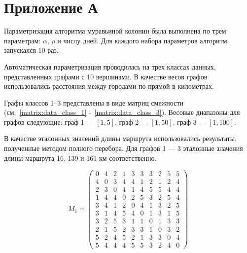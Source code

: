 \documentclass{bmstu}
\begin{document}
\setcounter{page}{3}

\chapter*{Приложение А}

Параметризация алгоритма муравьиной колонии была выполнена по трем параметрам: $\alpha$, $\rho$ и числу дней. Для каждого набора параметров алгоритм запускался 10 раз.  

Автоматическая параметризация проводилась на трех классах данных, представленных графами с 10 вершинами. В качестве весов графов использовались расстояния между городами по прямой в километрах.  

Графы классов 1–3 представлены в виде матриц смежности (см.~\ref{matrix:data_class_1} -~\ref{matrix:data_class_3}). Весовые диапазоны для графов следующие: граф 1 — $[1, 5]$, граф 2 — $[1, 50]$, граф 3 — $[1, 100]$.  

В качестве эталонных значений длины маршрута использовались результаты, полученные методом полного перебора. Для графов 1 --- 3 эталонные значения длины маршрута 16, 139 и 161 км соответственно.

\begin{equation}
\label{matrix:data_class_1}
M_{1} = \begin{pmatrix}
    0 & 4 & 2 & 1 & 3 & 3 & 3 & 2 & 5 & 5 \\
    4 & 0 & 3 & 4 & 4 & 1 & 2 & 1 & 2 & 4 \\
    2 & 3 & 0 & 4 & 1 & 4 & 5 & 5 & 4 & 4 \\
    1 & 4 & 4 & 0 & 2 & 5 & 3 & 2 & 5 & 4 \\
    3 & 4 & 1 & 2 & 0 & 4 & 1 & 3 & 2 & 5 \\
    3 & 1 & 4 & 5 & 4 & 0 & 1 & 3 & 1 & 5 \\
    3 & 2 & 5 & 3 & 1 & 1 & 0 & 1 & 3 & 3 \\
    2 & 1 & 5 & 2 & 3 & 3 & 1 & 0 & 3 & 2 \\
    5 & 2 & 4 & 5 & 2 & 1 & 3 & 3 & 0 & 4 \\
    5 & 4 & 4 & 4 & 5 & 5 & 3 & 2 & 4 & 0
\end{pmatrix}
\end{equation}
\end{document}
